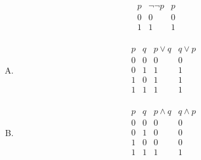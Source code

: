 {{        %
        \begin{practices}
            \begin{table}[H]
                \[
                    \begin{array}{c|c|c}
                        \hline
                        p & \neg \neg p & p \\
                        \hline
                        0 & 0 & 0 \\
                        1 & 1 & 1 \\
                    \end{array}
                \]
            \end{table}
        \end{practices}

        \begin{practices}
            \begin{enumerate}[A.]
                \item
                {
                    \begin{table}[H]
                        \[
                            \begin{array}{c|c|c|c}
                                \hline
                                p & q & p \vee q & q \vee p \\
                                \hline
                                0 & 0 & 0 & 0 \\
                                0 & 1 & 1 & 1 \\
                                1 & 0 & 1 & 1 \\
                                1 & 1 & 1 & 1 \\
                            \end{array}
                        \]
                    \end{table}
                }
                \item
                {
                    \begin{table}[H]
                        \[
                            \begin{array}{c|c|c|c}
                                \hline
                                p & q & p \wedge q & q \wedge p \\
                                \hline
                                0 & 0 & 0 & 0 \\
                                0 & 1 & 0 & 0 \\
                                1 & 0 & 0 & 0 \\
                                1 & 1 & 1 & 1 \\
                            \end{array}
                        \]
                    \end{table}
                }
            \end{enumerate}
        \end{practices}

}}
